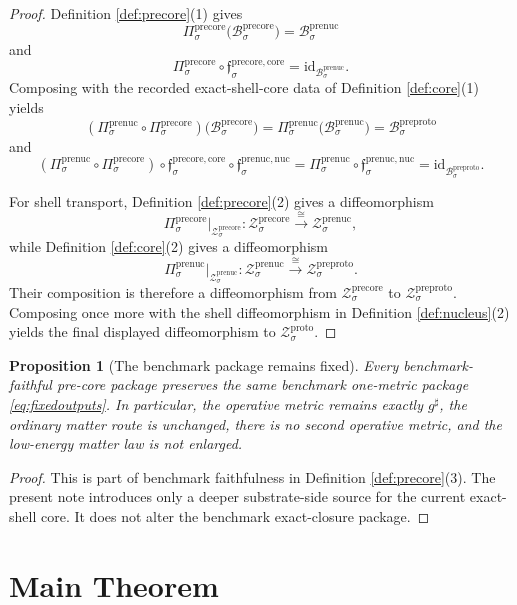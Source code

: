 \documentclass[11pt]{article}
\newcommand{\CompletedMetric}{g^{\sharp}}
\newcommand{\ProtoShellSet}[1]{\mathcal Z_{#1}^{\mathrm{proto}}}
\newcommand{\PreProtoBody}[1]{\mathcal B_{#1}^{\mathrm{preproto}}}
\newcommand{\PreProtoShellSet}[1]{\mathcal Z_{#1}^{\mathrm{preproto}}}
\newcommand{\PreNucBody}[1]{\mathcal B_{#1}^{\mathrm{prenuc}}}
\newcommand{\PreNucProj}[1]{\Pi_{#1}^{\mathrm{prenuc}}}
\newcommand{\PreNucNucleusMin}[1]{\mathfrak f_{#1}^{\mathrm{prenuc,nuc}}}
\newcommand{\PreNucShellSet}[1]{\mathcal Z_{#1}^{\mathrm{prenuc}}}
\newcommand{\PreCoreBody}[1]{\mathcal B_{#1}^{\mathrm{precore}}}
\newcommand{\PreCoreProj}[1]{\Pi_{#1}^{\mathrm{precore}}}
\newcommand{\PreCoreCoreMin}[1]{\mathfrak f_{#1}^{\mathrm{precore,core}}}
\newcommand{\PreCoreShellSet}[1]{\mathcal Z_{#1}^{\mathrm{precore}}}
\newtheorem{proposition}{Proposition}
\begin{document}
\begin{proof}
Definition \ref{def:precore}(1) gives
\[
\PreCoreProj{\sigma}\bigl(\PreCoreBody{\sigma}\bigr)=\PreNucBody{\sigma}
\]
and
\[
\PreCoreProj{\sigma}\circ\PreCoreCoreMin{\sigma}
=
\mathrm{id}_{\PreNucBody{\sigma}}.
\]
Composing with the recorded exact-shell-core data of Definition \ref{def:core}(1) yields
\[
(\PreNucProj{\sigma}\circ\PreCoreProj{\sigma})\bigl(\PreCoreBody{\sigma}\bigr)
=
\PreNucProj{\sigma}\bigl(\PreNucBody{\sigma}\bigr)
=
\PreProtoBody{\sigma}
\]
and
\[
(\PreNucProj{\sigma}\circ\PreCoreProj{\sigma})\circ
\PreCoreCoreMin{\sigma}\circ\PreNucNucleusMin{\sigma}
=
\PreNucProj{\sigma}\circ\PreNucNucleusMin{\sigma}
=
\mathrm{id}_{\PreProtoBody{\sigma}}.
\]

For shell transport, Definition \ref{def:precore}(2) gives a diffeomorphism
\[
\PreCoreProj{\sigma}\big|_{\PreCoreShellSet{\sigma}}
:
\PreCoreShellSet{\sigma}
\xrightarrow{\cong}
\PreNucShellSet{\sigma},
\]
while Definition \ref{def:core}(2) gives a diffeomorphism
\[
\PreNucProj{\sigma}\big|_{\PreNucShellSet{\sigma}}
:
\PreNucShellSet{\sigma}
\xrightarrow{\cong}
\PreProtoShellSet{\sigma}.
\]
Their composition is therefore a diffeomorphism from \(\PreCoreShellSet{\sigma}\) to \(\PreProtoShellSet{\sigma}\). Composing once more with the shell diffeomorphism in Definition \ref{def:nucleus}(2) yields the final displayed diffeomorphism to \(\ProtoShellSet{\sigma}\).
\end{proof}

\begin{proposition}[The benchmark package remains fixed]
\label{prop:benchmark}
Every benchmark-faithful pre-core package preserves the same benchmark one-metric package \eqref{eq:fixedoutputs}. In particular, the operative metric remains exactly \(\CompletedMetric\), the ordinary matter route is unchanged, there is no second operative metric, and the low-energy matter law is not enlarged.
\end{proposition}

\begin{proof}
This is part of benchmark faithfulness in Definition \ref{def:precore}(3). The present note introduces only a deeper substrate-side source for the current exact-shell core. It does not alter the benchmark exact-closure package.
\end{proof}

\section{Main Theorem}
\end{document}
